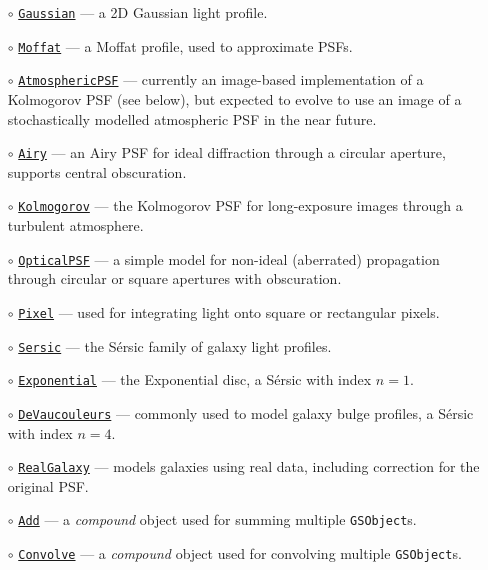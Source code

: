 \documentclass[preprint,11pt]{aastex}
\newcommand{\gsobject}{{\tt GSObject}}
\begin{document}
\begin{itemize}
\item[$\circ$]
  \href{http://galsim-developers.github.com/GalSim/classgalsim_1_1base_1_1_gaussian.html}{\texttt{Gaussian}}
  --- a 2D Gaussian light profile.
\item[$\circ$] \href{http://galsim-developers.github.com/GalSim/classgalsim_1_1base_1_1_moffat.html}{\texttt{Moffat}} --- a Moffat profile, used to approximate PSFs.
\item[$\circ$] \href{http://galsim-developers.github.com/GalSim/classgalsim_1_1base_1_1_atmospheric_p_s_f.html}{\texttt{AtmosphericPSF}} --- currently an image-based
  implementation of a Kolmogorov PSF (see below), but expected to evolve to
  use an image of a stochastically modelled atmospheric PSF in the near future.
\item[$\circ$] \href{http://galsim-developers.github.com/GalSim/classgalsim_1_1base_1_1_airy.html}{\texttt{Airy}} --- an Airy PSF for ideal diffraction
  through a circular aperture, supports central obscuration.
\item[$\circ$] \href{http://galsim-developers.github.com/GalSim/classgalsim_1_1base_1_1_kolmogorov.html}{\texttt{Kolmogorov}} --- the Kolmogorov PSF for long-exposure
  images through a turbulent atmosphere.
\item[$\circ$] \href{http://galsim-developers.github.com/GalSim/classgalsim_1_1base_1_1_optical_p_s_f.html}{\texttt{OpticalPSF}} --- a simple model for non-ideal
  (aberrated) propagation through circular or square apertures with obscuration.
\item[$\circ$] \href{http://galsim-developers.github.com/GalSim/classgalsim_1_1base_1_1_pixel.html}{\texttt{Pixel}} --- used for integrating light onto square or
  rectangular pixels.
\item[$\circ$] \href{http://galsim-developers.github.com/GalSim/classgalsim_1_1base_1_1_sersic.html}{\texttt{Sersic}} --- the S\'{e}rsic family of galaxy light
  profiles.
\item[$\circ$] \href{http://galsim-developers.github.com/GalSim/classgalsim_1_1base_1_1_exponential.html}{\texttt{Exponential}} --- the Exponential disc, a S\'{e}rsic
  with index $n=1$.
\item[$\circ$] \href{http://galsim-developers.github.com/GalSim/classgalsim_1_1base_1_1_de_vaucouleurs.html}{\texttt{DeVaucouleurs}} --- commonly used to model galaxy bulge
  profiles, a S\'{e}rsic with index $n=4$.
\item[$\circ$] \href{http://galsim-developers.github.com/GalSim/classgalsim_1_1base_1_1_real_galaxy.html}{\texttt{RealGalaxy}} --- models galaxies using real
  data, including correction for the original PSF.
\item[$\circ$] \href{http://galsim-developers.github.com/GalSim/classgalsim_1_1base_1_1_add.html}{\texttt{Add}} --- a \emph{compound} object used for
  summing multiple \gsobject s.
\item[$\circ$] \href{http://galsim-developers.github.com/GalSim/classgalsim_1_1base_1_1_convolve.html}{\texttt{Convolve}} --- a \emph{compound} object used for
convolving multiple \gsobject s.
\end{itemize}
\end{document}
